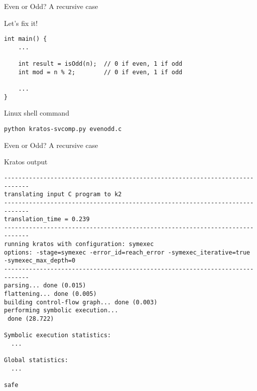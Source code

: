 \begin{frame}[fragile]{Even or Odd? A recursive case}
    \begin{block}{Let's fix it!}
            \begin{verbatim}
int main() {
    ...

    int result = isOdd(n);  // 0 if even, 1 if odd
    int mod = n % 2;        // 0 if even, 1 if odd

    ...
}
            \end{verbatim}
    \end{block}

    \pause

    \begin{block}{Linux shell command}
            \begin{verbatim}
python kratos-svcomp.py evenodd.c
            \end{verbatim}
    \end{block}
\end{frame}

\begin{frame}[fragile]{Even or Odd? A recursive case}
    \begin{block}{Kratos output}
            \begin{verbatim}
-----------------------------------------------------------------------------
translating input C program to k2
-----------------------------------------------------------------------------
translation_time = 0.239
-----------------------------------------------------------------------------
running kratos with configuration: symexec
options: -stage=symexec -error_id=reach_error -symexec_iterative=true -symexec_max_depth=0
-----------------------------------------------------------------------------
parsing... done (0.015)
flattening... done (0.005)
building control-flow graph... done (0.003)
performing symbolic execution...
 done (28.722)

Symbolic execution statistics:
  ...

Global statistics:
  ...

safe
            \end{verbatim}
    \end{block}
\end{frame}

